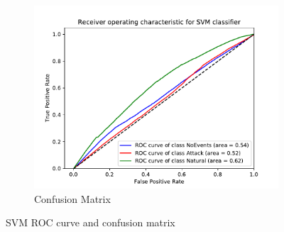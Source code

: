 \begin{figure}[H]
\begin{subfigure}[t]{0.3\textwidth}
        \includegraphics[page=2, width=\linewidth, trim= 0 50 0 100, clip]{images/results_scikit/SVM}
        \caption{Confusion Matrix}
        \label{fig:scikit_SVM_CM}
    \end{subfigure}
    \caption{SVM ROC curve and confusion matrix}
    \label{fig:ROCCM_SVM}
\end{figure}


